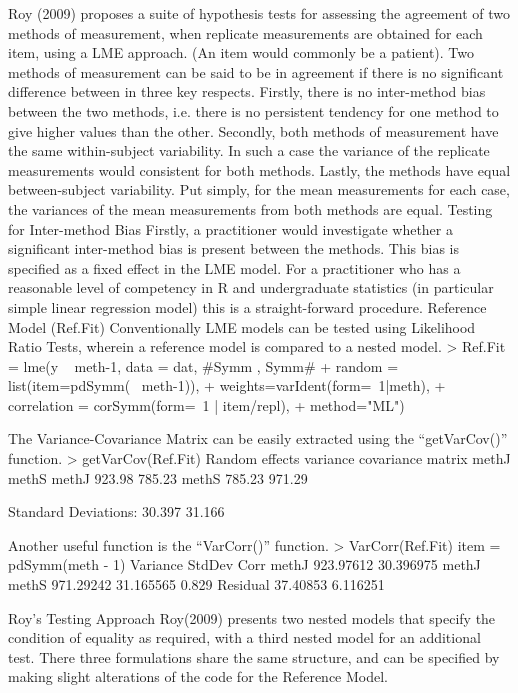 Roy (2009) proposes a suite of hypothesis tests for assessing the agreement of two methods of measurement, when replicate measurements are obtained for each item, using a LME approach. (An item would commonly be a patient).  
Two methods of measurement can be said to be in agreement if there is no significant difference between in three key respects. Firstly, there is no inter-method bias between the two methods, i.e. there is no persistent tendency for one method to give higher values than the other.
Secondly, both methods of measurement have the same  within-subject variability. In such a case the variance of the replicate measurements would consistent for both methods.
Lastly, the methods have equal between-subject variability.  Put simply, for the mean measurements for each case, the variances of the mean measurements from both methods are equal.
Testing for Inter-method Bias
Firstly, a practitioner would investigate whether a significant inter-method bias is present between the methods. This bias is specified as a fixed effect in the LME model.  For a practitioner who has a reasonable level of competency in R and undergraduate statistics (in particular simple linear regression model) this is a straight-forward procedure.
Reference Model (Ref.Fit)
Conventionally LME models can be tested using Likelihood Ratio Tests, wherein a reference model is compared to a nested model.
> Ref.Fit = lme(y ~ meth-1, data = dat,   #Symm , Symm#
+     random = list(item=pdSymm(~ meth-1)), 
+     weights=varIdent(form=~1|meth),
+     correlation = corSymm(form=~1 | item/repl), 
+     method="ML")

The Variance-Covariance Matrix can be easily extracted using the “getVarCov()” function.
> getVarCov(Ref.Fit)
Random effects variance covariance matrix
methJ     methS
methJ     923.98    785.23
methS     785.23    971.29

Standard Deviations: 30.397 31.166



Another useful function is the “VarCorr()” function.
> VarCorr(Ref.Fit)
item = pdSymm(meth - 1) 
Variance  StdDev    Corr 
methJ    923.97612 30.396975 methJ
methS    971.29242 31.165565 0.829
Residual  37.40853  6.116251  

Roy’s Testing Approach
Roy(2009) presents two nested models that specify the condition of equality as required, with a third nested model for an additional test. There three formulations share the same structure, and can be specified by making slight alterations of the code for the Reference Model.

